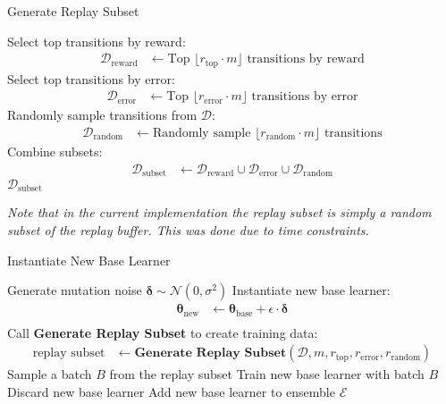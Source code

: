\begin{algorithm}[H]
\caption{Generate Replay Subset}
\begin{algorithmic}[1]
\State Select top transitions by reward:
\begin{align*}
    \mathcal{D}_{\text{reward}} &\gets \text{Top } \lfloor r_{\text{top}} \cdot m \rfloor \text{ transitions by reward}
\end{align*}
\State Select top transitions by error:
\begin{align*}
    \mathcal{D}_{\text{error}} &\gets \text{Top } \lfloor r_{\text{error}} \cdot m \rfloor \text{ transitions by error}
\end{align*}
\State Randomly sample transitions from $\mathcal{D}$:
\begin{align*}
    \mathcal{D}_{\text{random}} &\gets \text{Randomly sample } \lfloor r_{\text{random}} \cdot m \rfloor \text{ transitions}
\end{align*}
\State Combine subsets:
\begin{align*}
    \mathcal{D}_{\text{subset}} &\gets \mathcal{D}_{\text{reward}} \cup \mathcal{D}_{\text{error}} \cup \mathcal{D}_{\text{random}}
\end{align*}
\State \Return $\mathcal{D}_{\text{subset}}$
\end{algorithmic}
\end{algorithm}

\textit{Note that in the current implementation the replay subset is simply a random subset of the replay buffer. This was done due to time constraints.}


\begin{algorithm}[H]
\caption{Instantiate New Base Learner}
\begin{algorithmic}[1]
\State Generate mutation noise $\bm{\delta} \sim \mathcal{N}(0, \sigma^2)$
\State Instantiate new base learner:
\begin{align*}
    \bm{\theta}_{\text{new}} &\gets \bm{\theta}_{\text{base}} + \epsilon \cdot \bm{\delta} \\
\end{align*}
\State Call \textbf{Generate Replay Subset} to create training data:
\begin{align*}
    \text{replay subset} &\gets \textbf{Generate Replay Subset}(\mathcal{D}, m, r_{\text{top}}, r_{\text{error}}, r_{\text{random}})
\end{align*}
    \State Sample a batch $B$ from the replay subset
    \State Train new base learner with batch $B$ 
\EndFor
{}
    \State Discard new base learner
\Else
    \State Add new base learner to ensemble $\mathcal{E}$
\EndIf
\end{algorithmic}
\end{algorithm}

